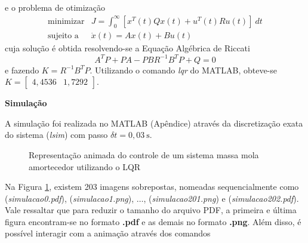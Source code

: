 \documentclass{article}
\begin{document}
e o problema de otimização 
\begin{equation*}
\begin{array}{rl}
    \text{minimizar} & J = \int_{0}^{\infty} \left[x^{T}(t)Qx(t) + u^{T}(t)Ru(t)\right]~dt \\
    \text{sujeito a} & \dot{x}(t) = Ax(t) + Bu(t)
\end{array}
\end{equation*}
cuja solução é obtida resolvendo-se a Equação Algébrica de Riccati
\begin{equation*}
    A^{T}P + PA - PBR^{-1}B^{T}P + Q = 0
\end{equation*}
e fazendo $K = R^{-1}B^{T}P$. Utilizando o comando \textit{lqr} do MATLAB\textsuperscript{\textregistered{}}, obteve-se $K = \left[ \begin{matrix} 4,4536 & 1,7292 \end{matrix} \right]$.

\begin{center}
    \textbf{Simulação}
\end{center}

\noindent
A simulação foi realizada no MATLAB\textsuperscript{\textregistered{}} (Apêndice) através da discretização exata do sistema (\textit{lsim}) com passo $\delta{}t = 0,03~\text{s}$.

\begin{figure}[H]
    \centering
    \caption{Representação animada do controle de um sistema massa mola amortecedor utilizando o LQR}
    \label{fig:massaMola}
\end{figure}

Na Figura \ref{fig:massaMola}, existem 203 imagens sobrepostas, nomeadas sequencialmente como (\textit{simulacao0.pdf}), (\textit{simulacao1.png}), $\dots$, (\textit{simulacao201.png}) e (\textit{simulacao202.pdf}). Vale ressaltar que para reduzir o tamanho do arquivo PDF, a primeira e última figura encontram-se no formato \textbf{.pdf} e as demais no formato \textbf{.png}. Além disso, é possível interagir com a animação através dos comandos
\end{document}
